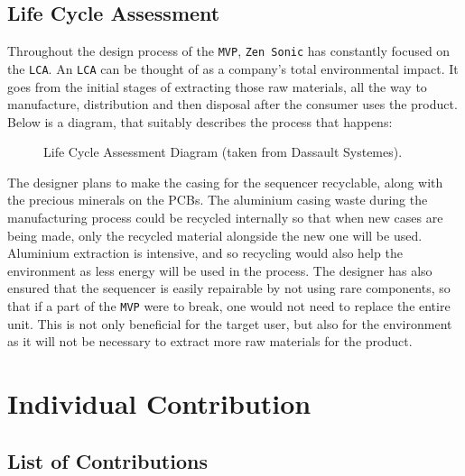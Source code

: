 \documentclass[12pt]{article}
\begin{document}
\subsection{Life Cycle Assessment}

Throughout the design process of the \texttt{MVP}, \texttt{Zen Sonic} has constantly focused on the \texttt{LCA}. An \texttt{LCA} can be thought of as a company's total environmental impact. It goes from the initial stages of extracting those raw materials, all the way to manufacture, distribution and then disposal after the consumer uses the product. Below is a diagram, that suitably describes the process that happens:

\begin{figure}[h!]
    \centering
    \caption{Life Cycle Assessment Diagram (taken from Dassault Systemes).}
    \label{fig:life-cycle}
\end{figure}

The designer plans to make the casing for the sequencer recyclable, along with the precious minerals on the PCBs. The aluminium casing waste during the manufacturing process could be recycled internally so that when new cases are being made, only the recycled material alongside the new one will be used. Aluminium extraction is intensive, and so recycling would also help the environment as less energy will be used in the process. The designer has also ensured that the sequencer is easily repairable by not using rare components, so that if a part of the \texttt{MVP} were to break, one would not need to replace the entire unit. This is not only beneficial for the target user, but also for the environment as it will not be necessary to extract more raw materials for the product. 


\section{Individual Contribution}
\subsection{List of Contributions}
\end{document}
